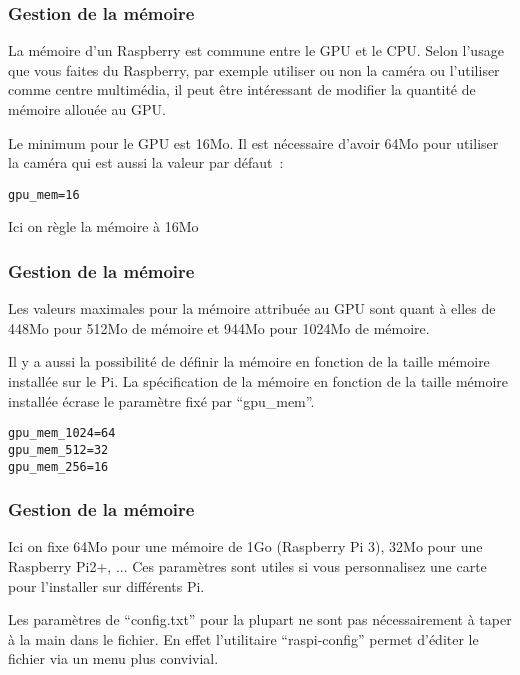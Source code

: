 \begin{frame}[containsverbatim]
\frametitle{Gestion de la mémoire}

La mémoire d'un Raspberry est commune entre le GPU et le CPU. Selon l'usage que vous faites du Raspberry, par exemple utiliser ou non la caméra ou l'utiliser comme centre multimédia, il peut être intéressant de modifier la quantité de mémoire allouée au GPU. 

Le minimum pour le GPU est 16Mo. Il est nécessaire d'avoir 64Mo pour utiliser la caméra qui est aussi la valeur par défaut~:
\begin{verbatim}
gpu_mem=16
\end{verbatim} 
Ici on règle la mémoire à 16Mo
\end{frame}


\begin{frame}[containsverbatim]
\frametitle{Gestion de la mémoire}
Les valeurs maximales pour la mémoire attribuée au GPU sont quant à elles de 448Mo pour 512Mo de mémoire et 944Mo pour 1024Mo de mémoire.

Il y a aussi la possibilité de définir la mémoire en fonction de la taille mémoire installée sur le Pi. La spécification de la mémoire en fonction de la taille mémoire installée écrase le paramètre fixé par ``gpu\_mem''.

\begin{verbatim}
gpu_mem_1024=64
gpu_mem_512=32
gpu_mem_256=16
\end{verbatim}
\end{frame}

\begin{frame}[containsverbatim]
\frametitle{Gestion de la mémoire}

Ici on fixe 64Mo pour une mémoire de 1Go (Raspberry Pi 3), 32Mo pour une Raspberry Pi2+, ... Ces paramètres sont utiles si vous personnalisez une carte pour l'installer sur différents Pi.

Les paramètres de ``config.txt'' pour la plupart ne sont pas nécessairement à taper à la main dans le fichier. En effet l'utilitaire ``raspi-config'' permet d'éditer le fichier via un menu plus convivial.

\end{frame}